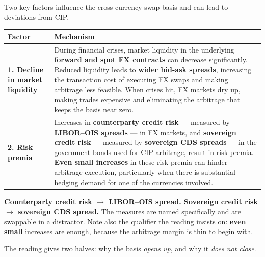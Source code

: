 
Two key factors influence the cross-currency swap basis and can lead to deviations from CIP.

\begin{center}
\small
\begin{tabularx}{\textwidth}{@{}p{3.6cm} X@{}}
\toprule
\rowcolor{FRMSoft}\textbf{Factor} & \textbf{Mechanism} \\
\midrule
\textbf{1. Decline in market liquidity} &
During financial crises, market liquidity in the underlying \textbf{forward and spot FX contracts} can decrease significantly. Reduced liquidity leads to \textbf{wider bid-ask spreads}, increasing the transaction cost of executing FX swaps and making arbitrage less feasible. When crises hit, FX markets dry up, making trades expensive and eliminating the arbitrage that keeps the basis near zero. \\
\addlinespace
\textbf{2. Risk premia} &
Increases in \textbf{counterparty credit risk} --- measured by \textbf{LIBOR--OIS spreads} --- in FX markets, and \textbf{sovereign credit risk} --- measured by \textbf{sovereign CDS spreads} --- in the government bonds used for CIP arbitrage, result in risk premia. \textbf{Even small increases} in these risk premia can hinder arbitrage execution, particularly when there is substantial hedging demand for one of the currencies involved. \\
\bottomrule
\end{tabularx}
\end{center}

\begin{lrtrapbox}
\textbf{Counterparty credit risk $\rightarrow$ LIBOR--OIS spread. Sovereign credit risk $\rightarrow$ sovereign CDS spread.} The measures are named specifically and are swappable in a distractor. Note also the qualifier the reading insists on: \textbf{even small} increases are enough, because the arbitrage margin is thin to begin with.
\end{lrtrapbox}


The reading gives two halves: why the basis \emph{opens up}, and why it \emph{does not close}.

